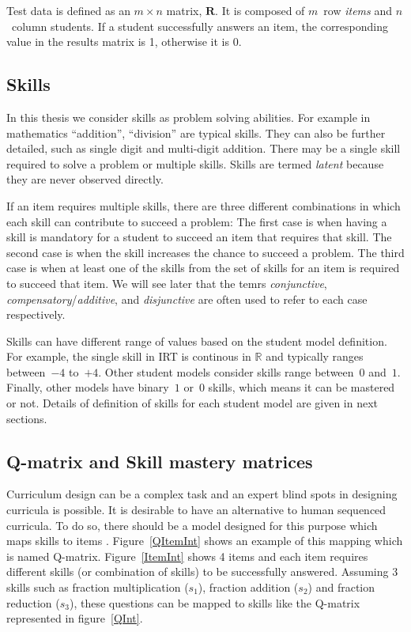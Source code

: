 Test data is defined as an $m \times n$ matrix, $\mathbf{R}$. It is composed of $m$~row \textit{items} and $n$~column students. If a student successfully answers an item, the corresponding value in the results matrix is 1, otherwise it is 0.

\subsection{Skills}

In this thesis we consider skills as problem solving abilities. For example in mathematics ``addition'', ``division'' are typical skills.  They can also be further detailed, such as single digit and multi-digit addition. There may be a single skill required to solve a problem or multiple skills. Skills are termed \textit{latent}  because they are never observed directly.

If an item requires multiple skills, there are three different combinations in which each skill can contribute to succeed a problem: The first case is when having a skill is mandatory for a student to succeed an item that requires that skill. The second case is when the skill increases the chance to succeed a problem. The third case is when at least one of the skills from the set of skills for an item is required to succeed that item.  We will see later that the temrs \textit{conjunctive}, \textit{compensatory}/\textit{additive}, and \textit{disjunctive} are often used to refer to each case respectively.

Skills can have different range of values based on the student model definition. For example, the single skill in IRT is continous in $\mathbb{R}$ and typically ranges between~$-4$ to~$+4$. Other student models consider skills range between~$0$ and~$1$. Finally, other models have binary~$1$ or~$0$ skills, which means it can be mastered or not. Details of definition of skills for each student model are given in next sections.

\subsection{Q-matrix and Skill mastery matrices}


Curriculum design can be a complex task and an expert blind spots in designing curricula is possible. It is desirable to have an alternative to human sequenced curricula. To do so, there should be a model designed for this purpose which maps skills to items \citep{Tatsuoka1983,Tatsuoka2009}. Figure~\ref{QItemInt} shows an example of this mapping which is named  Q-matrix.  Figure~\ref{ItemInt} shows 4 items and each item requires different skills (or combination of skills) to be successfully answered. Assuming 3 skills such as fraction multiplication ($s_{1}$), fraction addition ($s_{2}$) and fraction reduction ($s_{3}$), these questions can be mapped to skills like the Q-matrix represented in figure~\protect\ref{QInt}. 

